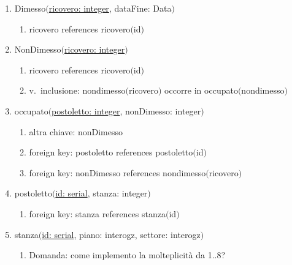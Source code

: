 \documentclass{article}
\begin{document}
\begin{enumerate}
\begin{enumerate}
    \end{enumerate}
    \item Dimesso$($\underline{ricovero: integer}, dataFine: Data$)$
    \begin{enumerate}
        \item ricovero references ricovero$($id$)$
    \end{enumerate}
    \item NonDimesso$($\underline{ricovero: integer}$)$
    \begin{enumerate}
        \item ricovero references ricovero$($id$)$
        \item v.\ inclusione: nondimesso$($ricovero$)$ occorre in occupato$($nondimesso$)$
    \end{enumerate}
    \item occupato$($\underline{postoletto: integer}, nonDimesso: integer$)$
    \begin{enumerate}
        \item altra chiave: nonDimesso
        \item foreign key: postoletto references postoletto$($id$)$
        \item foreign key: nonDimesso references nondimesso$($ricovero$)$
    \end{enumerate}
    \item postoletto$($\underline{id: serial}, stanza: integer$)$
    \begin{enumerate}
        \item foreign key: stanza references stanza$($id$)$
    \end{enumerate}
    \item stanza$($\underline{id: serial}, piano: interogz, settore: interogz$)$
    \begin{enumerate}
        \item Domanda: come implemento la molteplicità da 1..8?
    \end{enumerate}
\end{enumerate}
\end{document}
